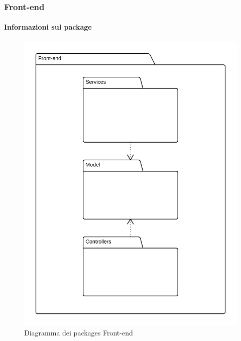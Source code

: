 
	\subsubsection{Front-end}
	\paragraph{Informazioni sul package} 
		\begin{figure}[H] 
			\begin{center} 
				\includegraphics[scale=0.2]{uml/package/Front-end.png}  
				\caption{Diagramma dei packages Front-end}
			\end{center}  
		\end{figure} 
		
